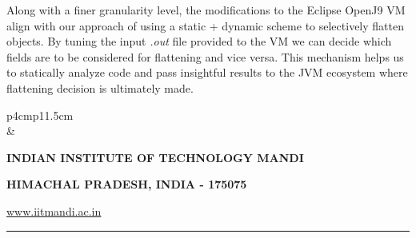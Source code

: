 \documentclass[12 pt, a4paper]{article}
\newcommand{\HRule}{\rule{\linewidth}{1mm}}
\begin{document}
Along with a finer granularity level, the modifications to the Eclipse OpenJ9 VM align with our 
approach of using a static +  dynamic scheme to selectively flatten objects. By tuning the input {\em .out} 
file provided to the VM we can decide which fields are to be considered for flattening and vice versa.
This mechanism helps us to statically analyze code and pass insightful results to the JVM ecosystem where
 flattening decision is ultimately made. 


\clearpage




\pagestyle{empty}
\vskip 0.2cm
	\begin{tabular}{p{4cm}p{11.5cm}}
		  \\
		& \centering \large\bf\phantom{Empty line}\\ 
		\rule{0pt}{1pt} \centering \large\bf{INDIAN INSTITUTE OF TECHNOLOGY MANDI} \\
		\rule{0pt}{1pt} \centering \large\bf{HIMACHAL PRADESH, INDIA - 175075} \\
		\rule{0pt}{1pt} \centering \underline{\href{www.iitmandi.ac.in}{www.iitmandi.ac.in}}\\
	\end{tabular}
\noindent

{\raggedleft{}\HRule}
\end{document}
